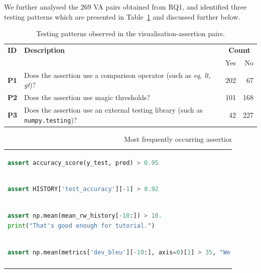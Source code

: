 \documentclass[conference]{IEEEtran}
\begin{document}
We further analysed the 269 VA pairs obtained from RQ1, and identified three testing patterns which are presented in Table~\ref{tab:testing-patterns} and discussed further below.

\begin{table}
  \centering
  \caption{Testing patterns observed in the visualisation-assertion pairs.}
  \begin{tabularx}{0.45\textwidth}{@{}l X r r@{}}
    \toprule
    \textbf{ID} &
    \textbf{Description} &
    \multicolumn{2}{c}{\textbf{Count}}\\
    & & Yes & No\\
    \midrule
    \textbf{P1} &
    Does the assertion use a comparison operator (such as \emph{eq, lt, gt})? &
    202 & 67\\
    \textbf{P2} &
    Does the assertion use magic thresholds? &
    101 & 168\\
    \textbf{P3} &
    Does the assertion use an external testing library (such as \texttt{numpy.testing})? &
    42 & 227\\
    \bottomrule
  \end{tabularx}
  \label{tab:testing-patterns}
\end{table}

\begin{table}
  \centering
  \caption{Most frequently occurring assertions that use a comparison operator.}
  \begin{tabular}{@{}m{0.9\linewidth}@{}}
    \toprule
    \begin{lstlisting}[language=Python,belowskip=0pt,aboveskip=0pt]
assert accuracy_score(y_test, pred) > 0.95\end{lstlisting}\\
    \begin{lstlisting}[language=Python,belowskip=0pt,aboveskip=0pt]
assert HISTORY['test_accuracy'][-1] > 0.92\end{lstlisting}\\
    \begin{lstlisting}[language=Python,belowskip=0pt,aboveskip=0pt]
assert np.mean(mean_rw_history[-10:]) > 10.
print("That's good enough for tutorial.")\end{lstlisting}\\
    \begin{lstlisting}[language=Python,belowskip=0pt,aboveskip=0pt]
assert np.mean(metrics['dev_bleu'][-10:], axis=0)[1] > 35, "We kind of need a higher bleu BLEU from you. Kind of right now."\end{lstlisting}\\
    \begin{lstlisting}[language=python,belowskip=0pt,aboveskip=0pt]
assert np.mean(dev_recall_history[-10:]) > 0.85, "Please train for at least 85% recall on test set. You may need to change vectorizer model for that."\end{lstlisting}\\
    \bottomrule
  \end{tabular}
  \label{tab:compare-op-asserts}
\end{table}
\end{document}
